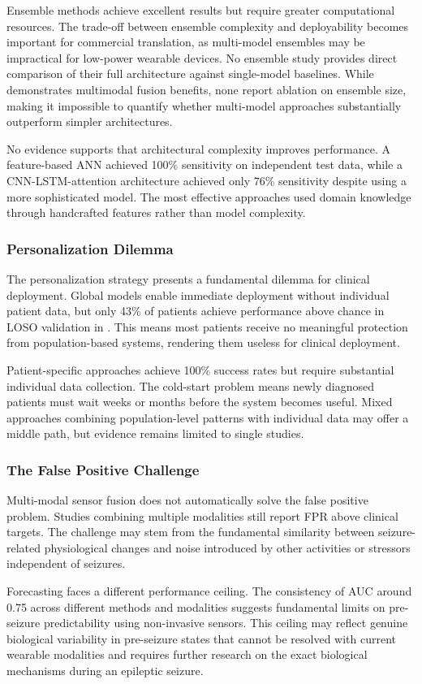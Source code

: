 Ensemble methods achieve excellent results but require greater computational resources. The trade-off between ensemble complexity and deployability becomes important for commercial translation, as multi-model ensembles may be impractical for low-power wearable devices. No ensemble study provides direct comparison of their full architecture against single-model baselines. While \textcite{dongDetectionNocturnalEpileptic2026} demonstrates multimodal fusion benefits, none report ablation on ensemble size, making it impossible to quantify whether multi-model approaches substantially outperform simpler architectures.

No evidence supports that architectural complexity improves performance. A feature-based ANN achieved 100\% sensitivity on independent test data, while a CNN-LSTM-attention architecture achieved only 76\% sensitivity despite using a more sophisticated model. The most effective approaches used domain knowledge through handcrafted features rather than model complexity.

\subsubsection{Personalization Dilemma}

The personalization strategy presents a fundamental dilemma for clinical deployment. Global models enable immediate deployment without individual patient data, but only 43\% of patients achieve performance above chance in LOSO validation in \textcite{meiselMachineLearningWristband2020}. This means most patients receive no meaningful protection from population-based systems, rendering them useless for clinical deployment.

Patient-specific approaches achieve 100\% success rates but require substantial individual data collection. The cold-start problem means newly diagnosed patients must wait weeks or months before the system becomes useful. Mixed approaches combining population-level patterns with individual data may offer a middle path, but evidence remains limited to single studies.

\subsubsection{The False Positive Challenge}

Multi-modal sensor fusion does not automatically solve the false positive problem. Studies combining multiple modalities still report FPR above clinical targets. The challenge may stem from the fundamental similarity between seizure-related physiological changes and noise introduced by other activities or stressors independent of seizures.

Forecasting faces a different performance ceiling. The consistency of AUC around 0.75 across different methods and modalities suggests fundamental limits on pre-seizure predictability using non-invasive sensors. This ceiling may reflect genuine biological variability in pre-seizure states that cannot be resolved with current wearable modalities and requires further research on the exact biological mechanisms during an epileptic seizure.
